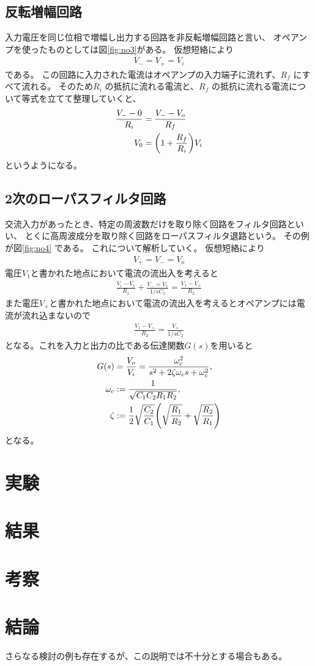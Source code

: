 \documentclass[11pt,dvipdfmx,a4paper]{jsarticle}
\begin{document}
\subsection{反転増幅回路}
入力電圧を同じ位相で増幅し出力する回路を非反転増幅回路と言い、
オペアンプを使ったものとしては図\ref{fig:no3}がある。
仮想短絡により
\begin{align}
	V_{-} = V_{+} = V_i
\end{align}
である。
この回路に入力された電流はオペアンプの入力端子に流れず、\(R_{f}\) にすべて流れる。
そのため\(R_i\) の抵抗に流れる電流と、\(R_f\) の抵抗に流れる電流について等式を立てて整理していくと、
\begin{align}
	\frac{V_{-}-0}{R_i} &= \frac{V_{-}-V_o}{R_f}\\
	V_0 &= \qty(1+\frac{R_f}{R_i}) V_i
\end{align}
というようになる。

\subsection{2次のローパスフィルタ回路}
交流入力があったとき、特定の周波数だけを取り除く回路をフィルタ回路といい、
とくに高周波成分を取り除く回路をローパスフィルタ退路という。
その例が図\ref{fig:no4} である。
これについて解析していく。
仮想短絡により
\begin{align}
	V_{+} = V_{-} = V_o
\end{align}
電圧\(V_1\)と書かれた地点において電流の流出入を考えると
\begin{align}
	\frac{V_i-V_1}{R_1}+\frac{V_{-}=V_1}{1/sC_1} = \frac{V_1-V_{+}}{R_2}
\end{align}
また電圧\(V_{+}\)と書かれた地点において電流の流出入を考えるとオペアンプには電流が流れ込まないので
\begin{align}
	\frac{V_1-V_{+}}{R_2} = \frac{V_{+}}{1/sC_2}
\end{align}
となる。これを入力と出力の比である伝達関数\(G(s)\)を用いると
\begin{align}
	G(s) &= \frac{V_o}{V_i} = \frac{\omega_c^2}{s^2+2\zeta\omega_c s+\omega_c^2},\\
	\omega_c &:= \frac{1}{\sqrt{C_1C_2R_1R_2}},\\
	\zeta &:= \frac{1}{2}\sqrt{\frac{C_2}{C_1}}\qty(\sqrt{\frac{R_1}{R_2}}+\sqrt{\frac{R_2}{R_1}})
\end{align}
となる。

\section{実験}

\section{結果}

\section{考察}

\section{結論}


さらなる検討の例\cite{huga}も存在するが、この説明では不十分とする場合もある\cite{hoge}。



\end{document}
